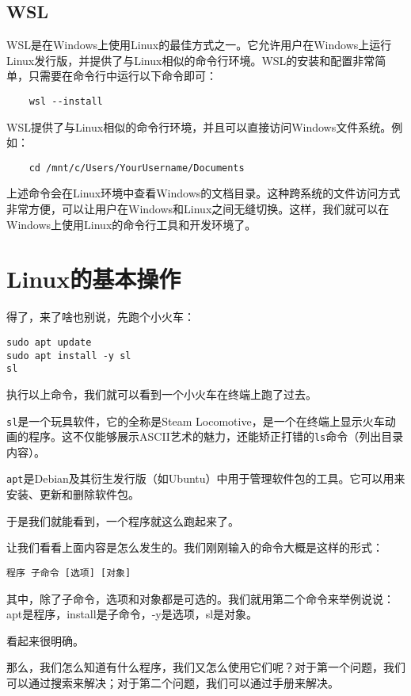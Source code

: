 \documentclass[../main.tex]{subfiles}
\begin{document}
\subsection{WSL}

WSL是在Windows上使用Linux的最佳方式之一。它允许用户在Windows上运行Linux发行版，并提供了与Linux相似的命令行环境。WSL的安装和配置非常简单，只需要在命令行中运行以下命令即可：
\begin{verbatim}
    wsl --install
\end{verbatim}
WSL提供了与Linux相似的命令行环境，并且可以直接访问Windows文件系统。例如：

\begin{verbatim}
    cd /mnt/c/Users/YourUsername/Documents
\end{verbatim}
上述命令会在Linux环境中查看Windows的文档目录。这种跨系统的文件访问方式非常方便，可以让用户在Windows和Linux之间无缝切换。这样，我们就可以在Windows上使用Linux的命令行工具和开发环境了。

\section{Linux的基本操作}

得了，来了啥也别说，先跑个小火车：

\begin{verbatim}
sudo apt update
sudo apt install -y sl
sl
\end{verbatim}

执行以上命令，我们就可以看到一个小火车在终端上跑了过去。

\texttt{sl}是一个玩具软件，它的全称是Steam Locomotive，是一个在终端上显示火车动画的程序。这不仅能够展示ASCII艺术的魅力，还能矫正打错的\texttt{ls}命令（列出目录内容）。

\texttt{apt}是Debian及其衍生发行版（如Ubuntu）中用于管理软件包的工具。它可以用来安装、更新和删除软件包。

于是我们就能看到，一个程序就这么跑起来了。

让我们看看上面内容是怎么发生的。我们刚刚输入的命令大概是这样的形式：
\begin{verbatim}
程序 子命令 [选项] [对象]
\end{verbatim}

其中，除了子命令，选项和对象都是可选的。我们就用第二个命令来举例说说：apt是程序，install是子命令，-y是选项，sl是对象。

看起来很明确。

那么，我们怎么知道有什么程序，我们又怎么使用它们呢？对于第一个问题，我们可以通过搜索来解决；对于第二个问题，我们可以通过手册来解决。
\end{document}
